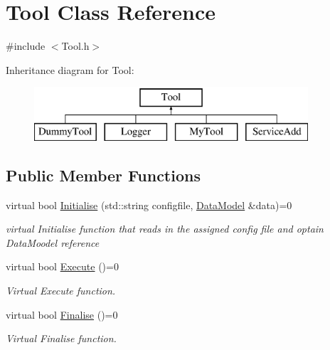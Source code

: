 \hypertarget{classTool}{\section{Tool Class Reference}
\label{classTool}
}


{\ttfamily \#include $<$Tool.\-h$>$}

Inheritance diagram for Tool\-:\begin{figure}[H]
\begin{center}
\leavevmode
\includegraphics[height=2.000000cm]{classTool}
\end{center}
\end{figure}
\subsection*{Public Member Functions}
\begin{DoxyCompactItemize}
\item 
virtual bool \hyperlink{classTool_a4b04a99172dfe09dc97927d1feaff0ce}{Initialise} (std\-::string configfile, \hyperlink{classDataModel}{Data\-Model} \&data)=0
\begin{DoxyCompactList}\small\item\em virtual Initialise function that reads in the assigned config file and optain Data\-Moodel reference \end{DoxyCompactList}\item 
\hypertarget{classTool_a6a71469fa4efffd6fb71afbd4941e49d}{virtual bool \hyperlink{classTool_a6a71469fa4efffd6fb71afbd4941e49d}{Execute} ()=0}\label{classTool_a6a71469fa4efffd6fb71afbd4941e49d}

\begin{DoxyCompactList}\small\item\em Virtual Execute function. \end{DoxyCompactList}\item 
\hypertarget{classTool_a1f9a82fe5cc9afd63fc8eb3aaf5d80ca}{virtual bool \hyperlink{classTool_a1f9a82fe5cc9afd63fc8eb3aaf5d80ca}{Finalise} ()=0}\label{classTool_a1f9a82fe5cc9afd63fc8eb3aaf5d80ca}

\begin{DoxyCompactList}\small\item\em Virtual Finalise function. \end{DoxyCompactList}\end{DoxyCompactItemize}
